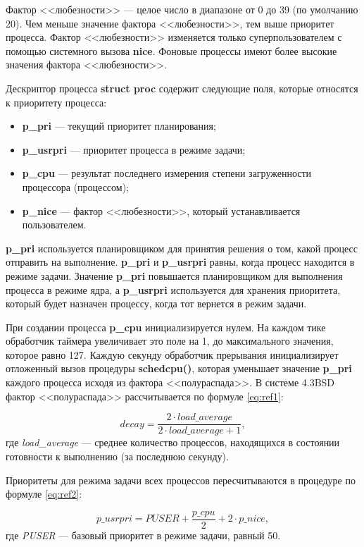 Фактор <<любезности>> --- целое число в диапазоне от 0 до 39 (по умолчанию 20).
Чем меньше значение фактора <<любезности>>, тем выше приоритет процесса.
Фактор <<любезности>> изменяется только суперпользователем с помощью системного вызова \textbf{nice}.
Фоновые процессы имеют более высокие значения фактора <<любезности>>.

Дескриптор процесса \textbf{struct proc} содержит следующие поля, которые относятся к приоритету процесса:
\begin{itemize}
	\item \textbf{p\_pri} --- текущий приоритет планирования;
	\item \textbf{p\_usrpri} --- приоритет процесса в режиме задачи;
	\item \textbf{p\_cpu} --- результат последнего измерения степени загруженности процессора (процессом);
	\item \textbf{p\_nice} --- фактор <<любезности>>, который устанавливается пользователем.
\end{itemize}

\textbf{p\_pri} используется планировщиком для принятия решения о том, какой процесс отправить на выполнение.
\textbf{p\_pri} и \textbf{p\_usrpri} равны, когда процесс находится в режиме задачи.
Значение \textbf{p\_pri} повышается планировщиком для выполнения процесса в режиме ядра, а \textbf{p\_usrpri} используется для хранения приоритета, который будет назначен процессу, когда тот вернется в режим задачи.

При создании процесса \textbf{p\_cpu} инициализируется нулем.
На каждом тике обработчик таймера увеличивает это поле на 1, до максимального значения, которое равно 127.
Каждую секунду обработчик прерывания инициализирует отложенный вызов процедуры \textbf{schedcpu()}, которая уменьшает значение \textbf{p\_pri} каждого процесса исходя из фактора <<полураспада>>. В системе 4.3BSD фактор <<полураспада>> рассчитывается по формуле \ref{eq:ref1}:

\begin{equation}
	\label{eq:ref1}
	decay = \frac{2 \cdot load\_average}{2 \cdot load\_average + 1} ,
\end{equation} где
\textit{load\_average} --- среднее количество процессов, находящихся в состоянии готовности к выполнению (за последнюю секунду).

Приоритеты для режима задачи всех процессов пересчитываются в процедуре  по формуле \ref{eq:ref2}:

\begin{equation}
	\label{eq:ref2}
	p\_usrpri = PUSER + \frac{p\_cpu}{2} + 2 \cdot p\_nice ,
\end{equation}где \textit{PUSER} --- базовый приоритет в режиме задачи, равный 50.

